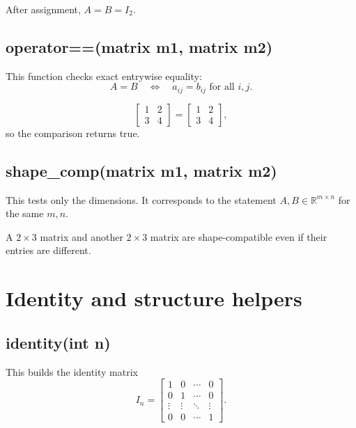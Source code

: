 \documentclass[11pt,a4paper,openany]{book}
\def\code#1{#1}%
\DeclareRobustCommand{\code}[1]{\texttt{\detokenize{#1}}}
\newcommand{\R}{\mathbb{R}}
\begin{document}
\begin{examplebox}[Example]
After assignment, \(A = B = I_2\).
\end{examplebox}

\subsection{\code{operator==(matrix m1, matrix m2)}}
This function checks exact entrywise equality:
\[
A = B \quad \Longleftrightarrow \quad a_{ij} = b_{ij} \text{ for all } i,j.
\]

\begin{examplebox}[Example]
\[
\begin{bmatrix}
1 & 2 \\
3 & 4
\end{bmatrix}
=
\begin{bmatrix}
1 & 2 \\
3 & 4
\end{bmatrix},
\]
so the comparison returns \code{true}.
\end{examplebox}

\subsection{\code{shape_comp(matrix m1, matrix m2)}}
This tests only the dimensions. It corresponds to the statement \(A, B \in \R^{m \times n}\) for the same \(m,n\).

\begin{examplebox}[Example]
A \(2 \times 3\) matrix and another \(2 \times 3\) matrix are shape-compatible even if their entries are different.
\end{examplebox}

\section{Identity and structure helpers}

\subsection{\code{identity(int n)}}
This builds the identity matrix
\[
I_n =
\begin{bmatrix}
1 & 0 & \cdots & 0 \\
0 & 1 & \cdots & 0 \\
\vdots & \vdots & \ddots & \vdots \\
0 & 0 & \cdots & 1
\end{bmatrix}.
\]
\end{document}
